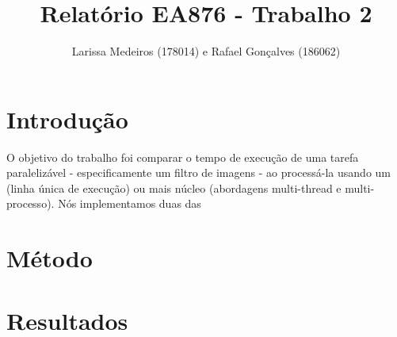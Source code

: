 \documentclass[a4paper, 10pt]{article}
\title{Relatório EA876 - Trabalho 2}
\author{Larissa Medeiros (178014) e Rafael Gonçalves (186062)}
\date{}
\begin{document}
\maketitle
\begin{multicols*}{2}

\section*{Introdução}

    O objetivo do trabalho foi comparar o tempo de execução de uma tarefa paralelizável - especificamente um filtro de imagens - ao processá-la usando um (linha única de execução) ou mais núcleo (abordagens multi-thread e multi-processo).
    Nós implementamos duas das 


\section*{Método}


\section*{Resultados}


\end{multicols*}
\end{document}
